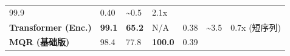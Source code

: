 \documentclass[
  12pt,
]{article}
\begin{document}
\begin{longtable}[]{@{}lllllll@{}}
\begin{minipage}[t]{0.12\columnwidth}
99.9\strut
\end{minipage} & \begin{minipage}[t]{0.12\columnwidth}\raggedright
0.40\strut
\end{minipage} & \begin{minipage}[t]{0.12\columnwidth}\raggedright
\textasciitilde0.5\strut
\end{minipage} & \begin{minipage}[t]{0.12\columnwidth}\raggedright
2.1x\strut
\end{minipage}\tabularnewline
\begin{minipage}[t]{0.12\columnwidth}\raggedright
\textbf{Transformer (Enc.)}\strut
\end{minipage} & \begin{minipage}[t]{0.12\columnwidth}\raggedright
\textbf{99.1}\strut
\end{minipage} & \begin{minipage}[t]{0.12\columnwidth}\raggedright
\textbf{65.2}\strut
\end{minipage} & \begin{minipage}[t]{0.12\columnwidth}\raggedright
N/A\strut
\end{minipage} & \begin{minipage}[t]{0.12\columnwidth}\raggedright
0.38\strut
\end{minipage} & \begin{minipage}[t]{0.12\columnwidth}\raggedright
\textasciitilde3.5\strut
\end{minipage} & \begin{minipage}[t]{0.12\columnwidth}\raggedright
0.7x (短序列)\strut
\end{minipage}\tabularnewline
\begin{minipage}[t]{0.12\columnwidth}\raggedright
\textbf{MQR (基础版)}\strut
\end{minipage} & \begin{minipage}[t]{0.12\columnwidth}\raggedright
98.4\strut
\end{minipage} & \begin{minipage}[t]{0.12\columnwidth}\raggedright
77.8\strut
\end{minipage} & \begin{minipage}[t]{0.12\columnwidth}\raggedright
\textbf{100.0}\strut
\end{minipage} & \begin{minipage}[t]{0.12\columnwidth}\raggedright
0.39\strut
\end{minipage} & \begin{minipage}[t]{0.12\columnwidth}\raggedright

\end{minipage}
\end{longtable}
\end{document}
